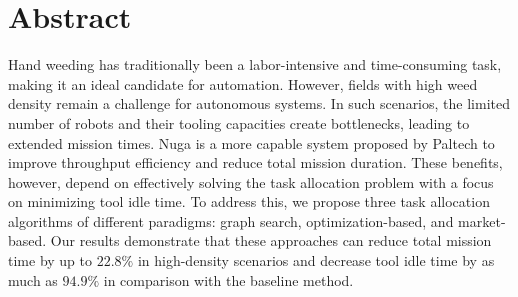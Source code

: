 \begingroup
\let\clearpage\relax
\let\cleardoublepage\relax
\let\cleardoublepage\relax

\chapter*{Abstract}
Hand weeding has traditionally been a labor-intensive and time-consuming task, making it an ideal candidate for automation. However, fields with high weed density remain a challenge for autonomous systems. In such scenarios, the limited number of robots and their tooling capacities create bottlenecks, leading to extended mission times. Nuga is a more capable system proposed by Paltech to improve throughput efficiency and reduce total mission duration. These benefits, however, depend on effectively solving the task allocation problem with a focus on minimizing tool idle time. To address this, we propose three task allocation algorithms of different paradigms: graph search, optimization-based, and market-based. Our results demonstrate that these approaches can reduce total mission time by up to $22.8\%$ in high-density scenarios and decrease tool idle time by as much as $94.9\%$ in comparison with the baseline method.

\vfill


\endgroup

\vfill
